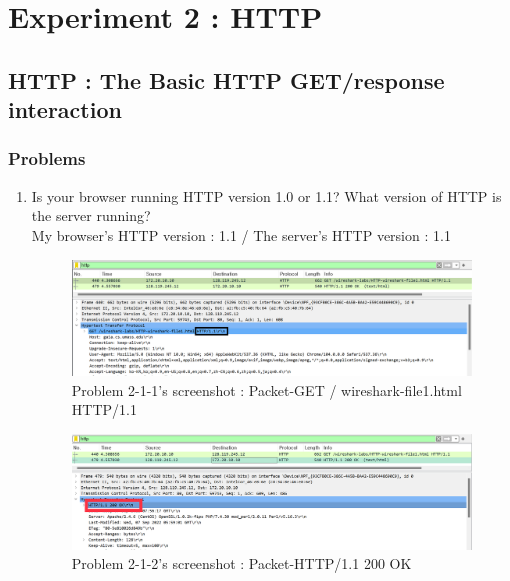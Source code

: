 \section{Experiment 2 : HTTP}
\subsection{HTTP : The Basic HTTP GET/response interaction}
    \subsubsection*{Problems}
    \begin{enumerate}[label=\bfseries Problem \arabic*:,leftmargin=*,labelindent=1em]
        \item Is your browser running HTTP version 1.0 or 1.1? What version of HTTP is the server running?\\[0.2mm]
            \soln My browser's HTTP version : 1.1 / The server's HTTP version : 1.1
            \vspace{-2mm}  
            \begin{figure}[!h]\centering
        		\includegraphics[width=.78\textwidth]{image/result_week01/Q2-1-1.png}
        		\caption{\footnotesize Problem 2-1-1's screenshot : Packet-GET / wireshark-file1.html HTTP/1.1}
        		\vspace{-10pt}
            \end{figure}
            \begin{figure}[!h]\centering
        		\includegraphics[width=.79\textwidth]{image/result_week01/Q2-1-2.png}
        		\caption{\footnotesize Problem 2-1-2's screenshot : Packet-HTTP/1.1 200 OK}
        		\vspace{-10pt}
            \end{figure}
            

\end{enumerate}
